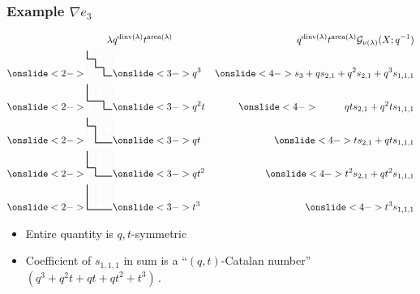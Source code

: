 \documentclass{beamer}
\DeclareMathOperator{\area}{area}
\DeclareMathOperator{\dinv}{dinv}
\newcommand{\Gcal}{\mathcal{G}}
\newcounter{c}
\begin{document}
\begin{frame}
  \frametitle{Example \(\nabla e_3\)}
  \vspace{-2em}
  \begin{eqnarray*}
    \lambda
    & q^{\dinv(\lambda)}t^{\area(\lambda)}
    & q^{\dinv(\lambda)}t^{\area(\lambda)}\Gcal_{\nu(\lambda)}(X;q^{-1})\\
      \onslide<2->{\begin{tikzpicture}[xscale = 0.3,yscale = 0.3]
      \draw[step=1cm,gray!20,very thin] (0,0) grid (3,3);
      \draw[step=1cm,gray!20,very thin] (0,3)--(3,0); \draw[thick]
      (0,3)--(0,2)--(1,2)--(1,1)--(2,1)--(2,0)--(3,0);
    \end{tikzpicture}}
    & \onslide<3->{q^3}
    & \onslide<4->{s_3+qs_{2,1}+q^2s_{2,1}+q^3s_{1,1,1}}\\
    \onslide<2->
    {
    \begin{tikzpicture}[xscale = 0.3,yscale = 0.3]
      \draw[step=1cm,gray!20,very thin] (0,0) grid (3,3);
      \draw[step=1cm,gray!20,very thin] (0,3)--(3,0); \draw[thick]
      (0,3)--(0,1)--(2,1)--(2,0)--(3,0);
    \end{tikzpicture}
    }
    & \onslide<3->{q^2t}
    & \onslide<4->{\phantom{ts_{2,1}+}qts_{2,1}+q^2ts_{1,1,1}}  \\
    \onslide<2->
    {
    \begin{tikzpicture}[xscale = 0.3,yscale = 0.3]
      \draw[step=1cm,gray!20,very thin] (0,0) grid (3,3);
      \draw[step=1cm,gray!20,very thin] (0,3)--(3,0); \draw[thick]
      (0,3)--(0,2)--(1,2)--(1,0)--(3,0);
    \end{tikzpicture}
    }
    & \onslide<3->{qt}
    & \onslide<4->{ts_{2,1}+qts_{1,1,1}}\\
    \onslide<2->
    {
    \begin{tikzpicture}[xscale = 0.3,yscale = 0.3]
      \draw[step=1cm,gray!20,very thin] (0,0) grid (3,3);
      \draw[step=1cm,gray!20,very thin] (0,3)--(3,0); \draw[thick]
      (0,3)--(0,1)--(1,1)--(1,0)--(3,0);
    \end{tikzpicture}
    }
    &\onslide<3->{qt^2}
    &\onslide<4->{ t^2 s_{2,1}+qt^2s_{1,1,1}}\\
    \onslide<2->
    {
    \begin{tikzpicture}[xscale = 0.3,yscale = 0.3]
      \draw[step=1cm,gray!20,very thin] (0,0) grid (3,3);
      \draw[step=1cm,gray!20,very thin] (0,3)--(3,0); \draw[thick]
      (0,3)--(0,0)--(3,0);
    \end{tikzpicture}
    }
    &\onslide<3->{t^3}
    & \onslide<4->{t^3s_{1,1,1}}
  \end{eqnarray*}
  \vspace{-0.75em}
  \begin{itemize}
  \item<5-> Entire quantity is \(q,t\)-symmetric
  \item<6-> Coefficient of \(s_{1,1,1}\) in sum is a ``\((q,t)\)-Catalan
    number'' \((q^3+q^2t+qt+qt^2+t^3)\)\,.
  \end{itemize}
\end{frame}
\end{document}
